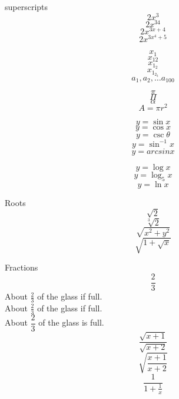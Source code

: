 \documentclass[11pt]{article}
\begin{document}
superscripts $$2x^3$$
$$2x^{34}$$
$$2x^{3x + 4}$$
$$2x^{3x^4+5}$$


$$x_1$$
$$x_{12}$$
$$x_{1_2}$$
$$x_{1_{2_3}}$$
$$a_1, a_2, \ldots a_{100}$$

$$\pi$$ %
$$\Pi$$ %
$$\alpha$$
$$A = \pi r^2$$

$$y = \sin x$$
$$y = \cos x$$
$$ y = \csc \theta$$
$$ y = \sin ^{-1}x$$
$$y = arcsin x$$

$$y = \log x$$
$$y = \log_5 x$$
$$y = \ln x$$

Roots
$$\sqrt{2}$$
$$\sqrt[3]{2}$$
$$\sqrt{x^2+y^2}$$
$$\sqrt{1+\sqrt{x}}$$

Fractions
$$\frac{2}{3}$$
About $\frac{2}{3}$ of the glass if full.\\[16pt]
About $\displaystyle \frac{2}{3}$ of the glass if full. \\[16pt]%
About $\dfrac{2}{3}$ of the glass is full.\\[6pt]

$$\frac{\sqrt{x+1}}{\sqrt{x+2}}$$
$$\sqrt{\frac{x+1}{x+2}}$$
$$\frac{1}{1+\frac{1}{x}}$$
\end{document}
